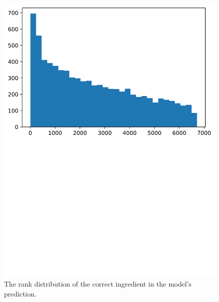  \begin{figure}[btp!]
     \includegraphics[width=\linewidth,trim={0 14cm 0 0},clip]{FIG/completion_val_ranks.pdf}
     \caption{\label{fig:completion_val_ranks} The rank distribution of the correct ingredient in the model's prediction.}
 \end{figure}

